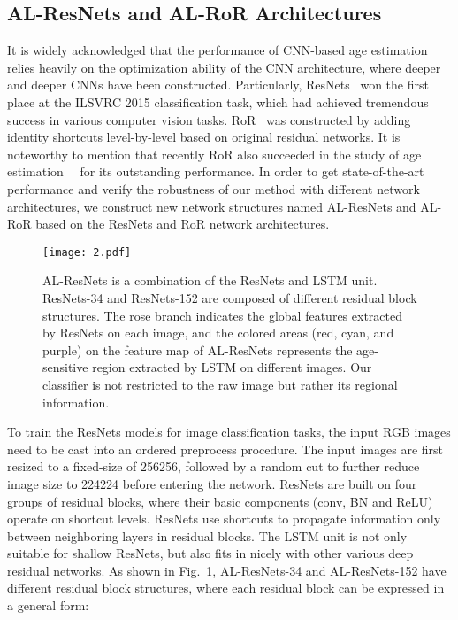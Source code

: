 \documentclass[journal]{IEEEtran}
\begin{document}
\subsection{AL-ResNets and AL-RoR Architectures}
It is widely acknowledged that the performance of CNN-based age estimation relies heavily on the optimization ability of the CNN architecture, where deeper and deeper CNNs have been constructed. Particularly, ResNets~\cite{ref-14} won the first place at the ILSVRC 2015 classification task, which had achieved tremendous success in various computer vision tasks. RoR~\cite{ref-15} was constructed by adding identity shortcuts level-by-level based on original residual networks. It is noteworthy to mention that recently RoR also succeeded in the study of age estimation~\cite{ref-6}~\cite{ref-22} for its outstanding performance. In order to get state-of-the-art performance and verify the robustness of our method with different network architectures, we construct new network structures named AL-ResNets and AL-RoR based on the ResNets and RoR network architectures.
\begin{figure}
\centering
\texttt{[image: 2.pdf]}
\caption{AL-ResNets is a combination of the ResNets and LSTM unit. ResNets-34 and ResNets-152 are composed of different residual block structures. The rose branch indicates the global features extracted by ResNets on each image, and the colored areas (red, cyan, and purple) on the feature map of AL-ResNets represents the age-sensitive region extracted by LSTM on different images. Our classifier is not restricted to the raw image but rather its regional information.}
\label{fig:AL-ResNets}
\end{figure}
\par
To train the ResNets models for image classification tasks, the input RGB images need to be cast into an ordered preprocess procedure. The input images are first resized to a fixed-size of 256256, followed by a random cut to further reduce image size to 224224 before entering the network. ResNets are built on four groups of residual blocks, where their basic components (conv, BN and ReLU) operate on shortcut levels. ResNets use shortcuts to propagate information only between neighboring layers in residual blocks. The LSTM unit is not only suitable for shallow ResNets, but also fits in nicely with other various deep residual networks. As shown in Fig.~\ref{fig:AL-ResNets}, AL-ResNets-34 and AL-ResNets-152 have different residual block structures, where each residual block can be expressed in a general form:
\end{document}

